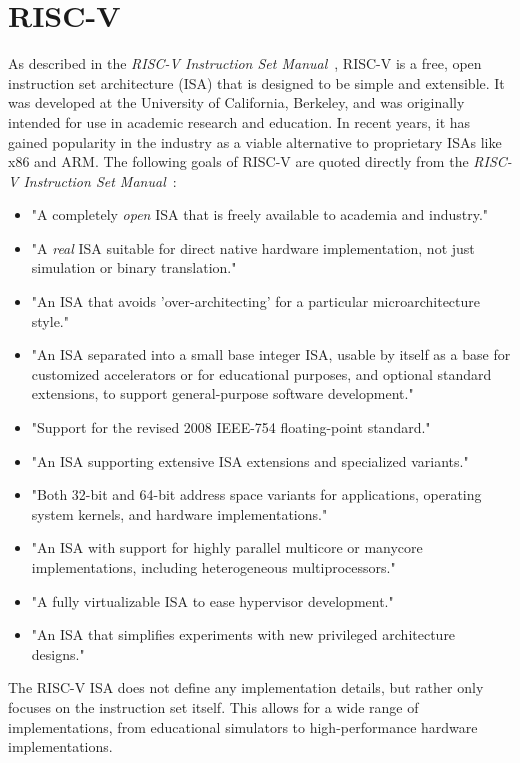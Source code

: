 \documentclass[sigconf]{acmart}
\begin{document}
\section{RISC-V}
As described in the \textit{RISC-V Instruction Set Manual}~\cite{riscv-spec}, RISC-V is a free, open instruction set architecture (ISA) that is designed to be simple and extensible.
It was developed at the University of California, Berkeley, and was originally intended for use in academic research and education. In recent years, it has gained popularity in the industry as a viable alternative to proprietary ISAs like x86 and ARM.
The following goals of RISC-V are quoted directly from the \textit{RISC-V Instruction Set Manual}~\cite{riscv-spec}:
\begin{itemize}
    \item "A completely \emph{open} ISA that is freely available to academia and industry." \cite{riscv-spec}
    \item "A \emph{real} ISA suitable for direct native hardware implementation, not just simulation or binary translation." \cite{riscv-spec}
    \item "An ISA that avoids 'over-architecting' for a particular microarchitecture style." \cite{riscv-spec}
    \item "An ISA separated into a small base integer ISA, usable by itself as a base for customized accelerators or for educational purposes, and optional standard extensions, to support general-purpose software development." \cite{riscv-spec}
    \item "Support for the revised 2008 IEEE-754 floating-point standard." \cite{riscv-spec}
    \item "An ISA supporting extensive ISA extensions and specialized variants." \cite{riscv-spec}
    \item "Both 32-bit and 64-bit address space variants for applications, operating system kernels, and hardware implementations." \cite{riscv-spec}
    \item "An ISA with support for highly parallel multicore or manycore implementations, including heterogeneous multiprocessors." \cite{riscv-spec}
    \item "A fully virtualizable ISA to ease hypervisor development." \cite{riscv-spec}
    \item "An ISA that simplifies experiments with new privileged architecture designs." \cite{riscv-spec}
\end{itemize}
The RISC-V ISA does not define any implementation details, but rather only focuses on the instruction set itself. This allows for a wide range of implementations, from educational simulators to high-performance hardware implementations. \cite{riscv-spec}
\end{document}
